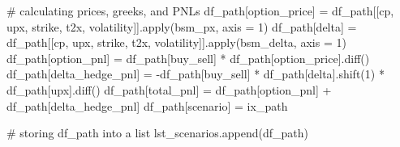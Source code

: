 \documentclass[
  letterpaper,
  DIV=11,
  numbers=noendperiod]{scrreprt}
\newenvironment{Shaded}{\begin{snugshade}}{\end{snugshade}}
\newcommand{\BuiltInTok}[1]{\textcolor[rgb]{0.00,0.23,0.31}{#1}}
\newcommand{\CommentTok}[1]{\textcolor[rgb]{0.37,0.37,0.37}{#1}}
\newcommand{\DecValTok}[1]{\textcolor[rgb]{0.68,0.00,0.00}{#1}}
\newcommand{\NormalTok}[1]{\textcolor[rgb]{0.00,0.23,0.31}{#1}}
\newcommand{\OperatorTok}[1]{\textcolor[rgb]{0.37,0.37,0.37}{#1}}
\newcommand{\StringTok}[1]{\textcolor[rgb]{0.13,0.47,0.30}{#1}}
\begin{document}
\begin{Shaded}
\begin{Highlighting}[]
    \CommentTok{\# calculating prices, greeks, and PNLs}
\NormalTok{    df\_path[}\StringTok{\textquotesingle{}option\_price\textquotesingle{}}\NormalTok{] }\OperatorTok{=}\NormalTok{ df\_path[[}\StringTok{\textquotesingle{}cp\textquotesingle{}}\NormalTok{, }\StringTok{\textquotesingle{}upx\textquotesingle{}}\NormalTok{, }\StringTok{\textquotesingle{}strike\textquotesingle{}}\NormalTok{, }\StringTok{\textquotesingle{}t2x\textquotesingle{}}\NormalTok{, }\StringTok{\textquotesingle{}volatility\textquotesingle{}}\NormalTok{]].}\BuiltInTok{apply}\NormalTok{(bsm\_px, axis }\OperatorTok{=} \DecValTok{1}\NormalTok{)}
\NormalTok{    df\_path[}\StringTok{\textquotesingle{}delta\textquotesingle{}}\NormalTok{] }\OperatorTok{=}\NormalTok{ df\_path[[}\StringTok{\textquotesingle{}cp\textquotesingle{}}\NormalTok{, }\StringTok{\textquotesingle{}upx\textquotesingle{}}\NormalTok{, }\StringTok{\textquotesingle{}strike\textquotesingle{}}\NormalTok{, }\StringTok{\textquotesingle{}t2x\textquotesingle{}}\NormalTok{, }\StringTok{\textquotesingle{}volatility\textquotesingle{}}\NormalTok{]].}\BuiltInTok{apply}\NormalTok{(bsm\_delta, axis }\OperatorTok{=} \DecValTok{1}\NormalTok{)}
\NormalTok{    df\_path[}\StringTok{\textquotesingle{}option\_pnl\textquotesingle{}}\NormalTok{] }\OperatorTok{=}\NormalTok{ df\_path[}\StringTok{\textquotesingle{}buy\_sell\textquotesingle{}}\NormalTok{] }\OperatorTok{*}\NormalTok{ df\_path[}\StringTok{\textquotesingle{}option\_price\textquotesingle{}}\NormalTok{].diff()}
\NormalTok{    df\_path[}\StringTok{\textquotesingle{}delta\_hedge\_pnl\textquotesingle{}}\NormalTok{] }\OperatorTok{=} \OperatorTok{{-}}\NormalTok{df\_path[}\StringTok{\textquotesingle{}buy\_sell\textquotesingle{}}\NormalTok{] }\OperatorTok{*}\NormalTok{ df\_path[}\StringTok{\textquotesingle{}delta\textquotesingle{}}\NormalTok{].shift(}\DecValTok{1}\NormalTok{) }\OperatorTok{*}\NormalTok{ df\_path[}\StringTok{\textquotesingle{}upx\textquotesingle{}}\NormalTok{].diff()}
\NormalTok{    df\_path[}\StringTok{\textquotesingle{}total\_pnl\textquotesingle{}}\NormalTok{] }\OperatorTok{=}\NormalTok{ df\_path[}\StringTok{\textquotesingle{}option\_pnl\textquotesingle{}}\NormalTok{] }\OperatorTok{+}\NormalTok{ df\_path[}\StringTok{\textquotesingle{}delta\_hedge\_pnl\textquotesingle{}}\NormalTok{]}
\NormalTok{    df\_path[}\StringTok{\textquotesingle{}scenario\textquotesingle{}}\NormalTok{] }\OperatorTok{=}\NormalTok{ ix\_path}
    
    \CommentTok{\# storing df\_path into a list}
\NormalTok{    lst\_scenarios.append(df\_path)}
    

\end{Highlighting}
\end{Shaded}
\end{document}
